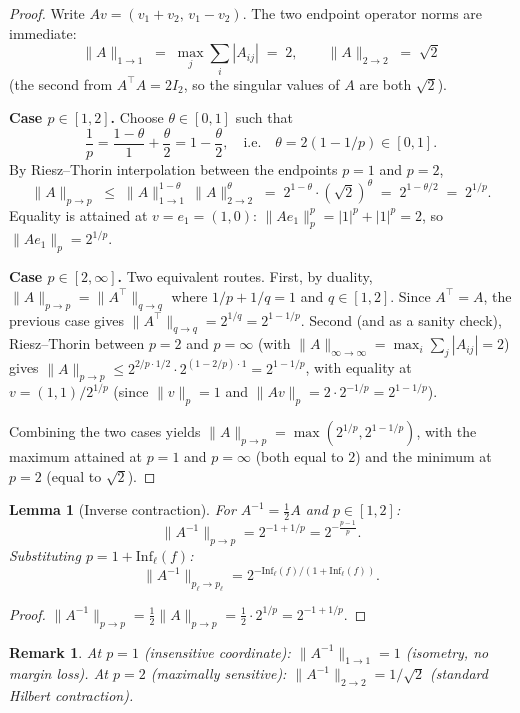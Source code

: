 \documentclass[11pt]{article}
\newtheorem{lemma}[theorem]{Lemma}
\newtheorem{remark}[theorem]{Remark}
\newcommand{\Inf}{\mathrm{Inf}}
\begin{document}
\begin{proof}
Write $Av = (v_1+v_2,\,v_1-v_2)$. The two endpoint operator norms are immediate:
\[
\|A\|_{1\to 1} \;=\; \max_{j}\sum_i |A_{ij}| \;=\; 2,\qquad
\|A\|_{2\to 2} \;=\; \sqrt{2}
\]
(the second from $A^\top A = 2 I_2$, so the singular values of $A$ are both $\sqrt{2}$).

\textbf{Case $p \in [1,2]$.} Choose $\theta \in [0, 1]$ such that
\[
\frac{1}{p} = \frac{1-\theta}{1} + \frac{\theta}{2} = 1 - \frac{\theta}{2},
\quad\text{i.e.}\quad \theta = 2(1 - 1/p) \in [0, 1].
\]
By Riesz--Thorin interpolation \cite{bergh1976interpolation} between the endpoints $p=1$ and $p=2$,
\[
\|A\|_{p \to p} \;\le\; \|A\|_{1 \to 1}^{1 - \theta} \,\|A\|_{2 \to 2}^{\theta} \;=\; 2^{1 - \theta} \cdot (\sqrt{2})^{\theta} \;=\; 2^{1 - \theta/2} \;=\; 2^{1/p}.
\]
Equality is attained at $v = e_1 = (1, 0)$: $\|Ae_1\|_p^p = |1|^p + |1|^p = 2$, so $\|Ae_1\|_p = 2^{1/p}$.

\textbf{Case $p \in [2,\infty]$.} Two equivalent routes. First, by duality, $\|A\|_{p\to p} = \|A^\top\|_{q \to q}$ where $1/p + 1/q = 1$ and $q \in [1, 2]$. Since $A^\top = A$, the previous case gives $\|A^\top\|_{q\to q} = 2^{1/q} = 2^{1 - 1/p}$. Second (and as a sanity check), Riesz--Thorin between $p=2$ and $p=\infty$ (with $\|A\|_{\infty \to \infty} = \max_i \sum_j |A_{ij}| = 2$) gives $\|A\|_{p\to p} \le 2^{2/p \cdot 1/2} \cdot 2^{(1 - 2/p) \cdot 1} = 2^{1 - 1/p}$, with equality at $v = (1, 1)/2^{1/p}$ (since $\|v\|_p = 1$ and $\|Av\|_p = 2 \cdot 2^{-1/p} = 2^{1 - 1/p}$).

Combining the two cases yields $\|A\|_{p\to p} = \max(2^{1/p}, 2^{1-1/p})$, with the maximum attained at $p=1$ and $p=\infty$ (both equal to $2$) and the minimum at $p=2$ (equal to $\sqrt{2}$).
\end{proof}

\begin{lemma}[Inverse contraction]
\label{lem:contraction}
For $A^{-1} = \frac{1}{2}A$ and $p \in [1, 2]$:
\[
\|A^{-1}\|_{p \to p} = 2^{-1 + 1/p} = 2^{-\frac{p-1}{p}}.
\]
Substituting $p = 1 + \Inf_\ell(f)$:
\[
\|A^{-1}\|_{p_\ell \to p_\ell} = 2^{-\Inf_\ell(f)/(1 + \Inf_\ell(f))}.
\]
\end{lemma}

\begin{proof}
$\|A^{-1}\|_{p \to p} = \frac{1}{2}\|A\|_{p \to p} = \frac{1}{2} \cdot 2^{1/p} = 2^{-1+1/p}$.
\end{proof}

\begin{remark}
At $p=1$ (insensitive coordinate): $\|A^{-1}\|_{1 \to 1} = 1$ (isometry, no margin loss).
At $p=2$ (maximally sensitive): $\|A^{-1}\|_{2 \to 2} = 1/\sqrt{2}$ (standard Hilbert contraction).
\end{remark}
\end{document}
